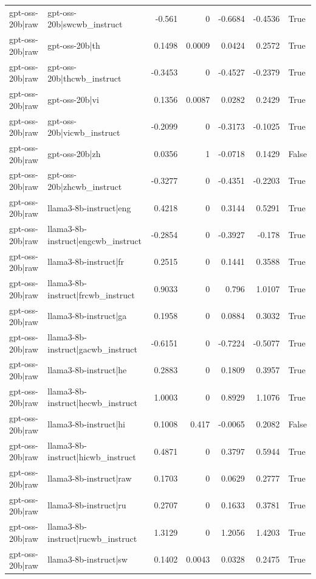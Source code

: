 \begin{table}
\begin{tabular}{l l r r r r l}
gpt-oss-20b|raw & gpt-oss-20b|swcwb_instruct & -0.561 & 0 & -0.6684 & -0.4536 & True \\
gpt-oss-20b|raw & gpt-oss-20b|th & 0.1498 & 0.0009 & 0.0424 & 0.2572 & True \\
gpt-oss-20b|raw & gpt-oss-20b|thcwb_instruct & -0.3453 & 0 & -0.4527 & -0.2379 & True \\
gpt-oss-20b|raw & gpt-oss-20b|vi & 0.1356 & 0.0087 & 0.0282 & 0.2429 & True \\
gpt-oss-20b|raw & gpt-oss-20b|vicwb_instruct & -0.2099 & 0 & -0.3173 & -0.1025 & True \\
gpt-oss-20b|raw & gpt-oss-20b|zh & 0.0356 & 1 & -0.0718 & 0.1429 & False \\
gpt-oss-20b|raw & gpt-oss-20b|zhcwb_instruct & -0.3277 & 0 & -0.4351 & -0.2203 & True \\
gpt-oss-20b|raw & llama3-8b-instruct|eng & 0.4218 & 0 & 0.3144 & 0.5291 & True \\
gpt-oss-20b|raw & llama3-8b-instruct|engcwb_instruct & -0.2854 & 0 & -0.3927 & -0.178 & True \\
gpt-oss-20b|raw & llama3-8b-instruct|fr & 0.2515 & 0 & 0.1441 & 0.3588 & True \\
gpt-oss-20b|raw & llama3-8b-instruct|frcwb_instruct & 0.9033 & 0 & 0.796 & 1.0107 & True \\
gpt-oss-20b|raw & llama3-8b-instruct|ga & 0.1958 & 0 & 0.0884 & 0.3032 & True \\
gpt-oss-20b|raw & llama3-8b-instruct|gacwb_instruct & -0.6151 & 0 & -0.7224 & -0.5077 & True \\
gpt-oss-20b|raw & llama3-8b-instruct|he & 0.2883 & 0 & 0.1809 & 0.3957 & True \\
gpt-oss-20b|raw & llama3-8b-instruct|hecwb_instruct & 1.0003 & 0 & 0.8929 & 1.1076 & True \\
gpt-oss-20b|raw & llama3-8b-instruct|hi & 0.1008 & 0.417 & -0.0065 & 0.2082 & False \\
gpt-oss-20b|raw & llama3-8b-instruct|hicwb_instruct & 0.4871 & 0 & 0.3797 & 0.5944 & True \\
gpt-oss-20b|raw & llama3-8b-instruct|raw & 0.1703 & 0 & 0.0629 & 0.2777 & True \\
gpt-oss-20b|raw & llama3-8b-instruct|ru & 0.2707 & 0 & 0.1633 & 0.3781 & True \\
gpt-oss-20b|raw & llama3-8b-instruct|rucwb_instruct & 1.3129 & 0 & 1.2056 & 1.4203 & True \\
gpt-oss-20b|raw & llama3-8b-instruct|sw & 0.1402 & 0.0043 & 0.0328 & 0.2475 & True \\

\end{tabular}
\end{table}
